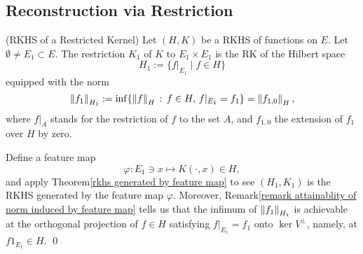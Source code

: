 \documentclass[a4paper,12pt]{article}
\begin{document}
\subsection{Reconstruction via Restriction}
\begin{cor} (RKHS of a Restricted Kernel)\label{rkhs of restricted kernel}
	Let \( (H,K) \) be a RKHS of functions on \( E \). Let \( \emptyset \neq E_1 \subset E \). The restriction \( K_1 \) of \( K \) to \( E_1 \times E_1 \) is the RK of the Hilbert space
	\begin{equation*}
		H_1 := \{f|_{E_1} \mid f \in H \}
	\end{equation*}
	equipped with the norm
	\begin{equation*}
		\left\| f_1 \right\|_{H_1} := \inf \{\left\| f \right\|_{H} \,:\, f \in H ,\, f|_{E_1} = f_1\} = \left\| f_{1,0} \right\|_H,
	\end{equation*}
	where \( f|_{A} \) stands for the restriction of \( f \) to the set \( A \), and \( f_{1,0} \) the extension of \( f_1 \) over \( H \) by zero.
\end{cor}
\begin{prf}
	Define a feature map
	\begin{equation*}
		\varphi: E_1 \ni x \mapsto K(\cdot ,x) \in H,
	\end{equation*}
	and apply Theorem\ref{rkhs generated by feature map} to see \( (H_1, K_1) \) is the RKHS generated by the feature map \( \varphi \). Moreover, Remark\ref{remark attainablity of norm induced by feature map} tells us that the infimum of \( \left\| f_1 \right\|_{H_1} \) is achievable at the orthogonal projection  of \( f \in H \) satisfying \( f|_{E_1} = f_1 \) onto \( \ker V ^{\perp } \), namely, at \( f 1_{E_1} \in H \).
	\qed\end{prf}
\end{document}
